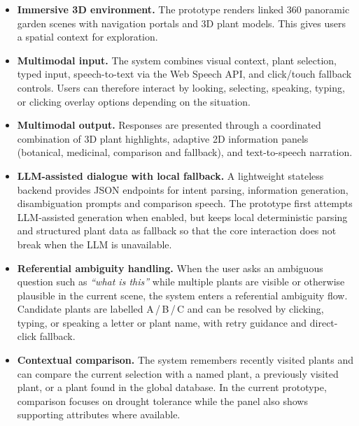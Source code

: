 \documentclass[12pt,a4paper]{article}
\begin{document}
\begin{itemize}
    \item \textbf{Immersive 3D environment.} The prototype renders linked
    360\textdegree{} panoramic garden scenes with navigation
    portals and 3D plant models. This gives users a spatial
    context for exploration.

    \item \textbf{Multimodal input.} The system combines visual context,
    plant selection, typed input, speech-to-text via the Web
    Speech API, and click/touch fallback controls. Users can therefore
    interact by looking, selecting, speaking, typing, or clicking overlay
    options depending on the situation.

    \item \textbf{Multimodal output.} Responses are presented through a
    coordinated combination of 3D plant highlights, adaptive 2D information
    panels (botanical, medicinal, comparison and fallback), and text-to-speech
    narration.

    \item \textbf{LLM-assisted dialogue with local fallback.} A lightweight
    stateless backend provides JSON endpoints for intent parsing, information
    generation, disambiguation prompts and comparison speech. The prototype
    first attempts LLM-assisted generation when enabled, but keeps local
    deterministic parsing and structured plant data as fallback so that the
    core interaction does not break when the LLM is unavailable.

    \item \textbf{Referential ambiguity handling.} When the user asks an
    ambiguous question such as \emph{``what is this''} while multiple plants
    are visible or otherwise plausible in the current scene, the system enters
    a referential ambiguity flow. Candidate plants are labelled
    A\,/\,B\,/\,C and can be resolved by clicking, typing, or speaking a
    letter or plant name, with retry guidance and direct-click fallback.

    \item \textbf{Contextual comparison.} The system remembers recently
    visited plants and can compare the current selection with a named plant,
    a previously visited plant, or a plant found in the global database. In
    the current prototype, comparison focuses on drought tolerance while the
    panel also shows supporting attributes where available.
\end{itemize}
\end{document}
